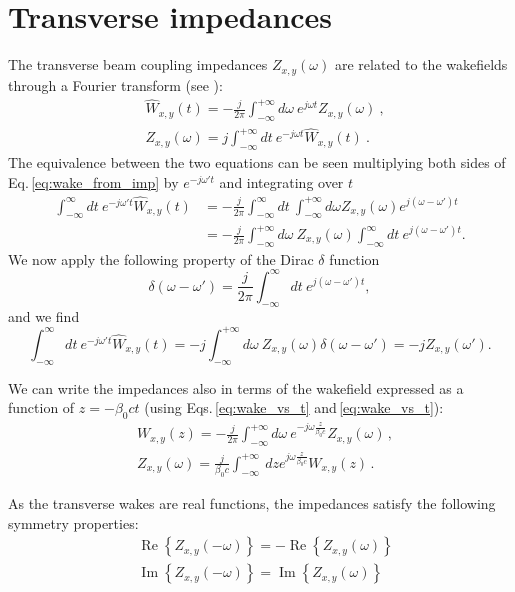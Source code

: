 \section{Transverse impedances}
The transverse beam coupling impedances $Z_{x,y}(\omega)$ are related to the wakefields through a Fourier transform (see \cite[Eq. 1.216]{Mounet:Thesis}):
\begin{align}
    &\widehat{W}_{x,y}(t) = -\frac{j}{2\pi}\int_{-\infty}^{+\infty} d\omega \ e^{j\omega t} Z_{x,y}(\omega)~,\label{eq:wake_from_imp}\\
    &Z_{x,y}(\omega) = j\int_{-\infty}^{+\infty} dt \ e^{-j\omega t} \widehat{W}_{x,y}(t)~.\label{eq:imp_from_wake}
\end{align}
The equivalence between the two equations can be seen multiplying both sides of Eq.\,\ref{eq:wake_from_imp} by $e^{-j\omega' t}$ and integrating over $t$
\begin{align}
    \int_{-\infty}^{\infty}dt \ e^{-j\omega' t}\widehat{W}_{x,y}(t) &= -\frac{j}{2\pi}\int_{-\infty}^{\infty}dt \ \int_{-\infty}^{+\infty} d\omega Z_{x,y}(\omega)e^{j(\omega-\omega') t}\\
    &= -\frac{j}{2\pi} \int_{-\infty}^{+\infty} d\omega \ Z_{x,y}(\omega) \int_{-\infty}^{\infty}dt \ e^{j(\omega-\omega') t}.
\end{align}
We now apply the following property of the Dirac $\delta$ function
\begin{equation}
    \delta(\omega-\omega') =  \frac{j}{2\pi} \int_{-\infty}^{\infty} dt \ e^{j(\omega-\omega') t},
\end{equation}
and we find
\begin{equation}
    \int_{-\infty}^{\infty}dt \ e^{-j\omega' t}\widehat{W}_{x,y}(t) = -j \int_{-\infty}^{+\infty} d\omega \ Z_{x,y}(\omega) \delta(\omega-\omega') = -j Z_{x, y}(\omega').
\end{equation}

We can write the impedances also in terms of the wakefield expressed as a function of $z= -\beta_0 c t$ (using Eqs.\,\ref{eq:wake_vs_t} and\,\ref{eq:wake_vs_t}):
\begin{align}
    &W_{x,y}(z) = -\frac{j}{2\pi}\int_{-\infty}^{+\infty} d\omega \ e^{-j\omega \frac{z}{\beta_0 c}} Z_{x,y}(\omega)\, ,\\
    &Z_{x,y}(\omega) = \frac{j}{\beta_0 c} \int_{-\infty}^{+\infty} \ dz e^{j \omega \frac{z}{\beta_0 c}} W_{x,y}(z)\, .
\end{align}

As the transverse wakes are real functions, the impedances satisfy the following symmetry properties:
\begin{align}
&\operatorname{Re}\left\{ Z_{x,y}( - \omega) \right\}
=
-\operatorname{Re}\left\{ Z_{x,y}( \omega) \right\}\\
&\operatorname{Im}\left\{ Z_{x,y}( -\omega) \right\}
=
\operatorname{Im}\left\{ Z_{x,y}( \omega) \right\}
\end{align}

